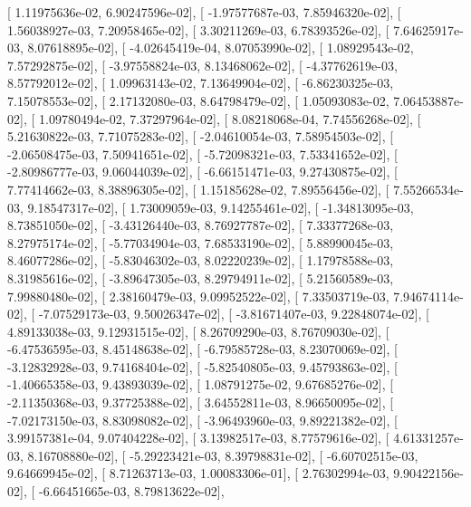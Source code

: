 \documentclass{article}
\begin{document}
       [  1.11975636e-02,   6.90247596e-02],
       [ -1.97577687e-03,   7.85946320e-02],
       [  1.56038927e-03,   7.20958465e-02],
       [  3.30211269e-03,   6.78393526e-02],
       [  7.64625917e-03,   8.07618895e-02],
       [ -4.02645419e-04,   8.07053990e-02],
       [  1.08929543e-02,   7.57292875e-02],
       [ -3.97558824e-03,   8.13468062e-02],
       [ -4.37762619e-03,   8.57792012e-02],
       [  1.09963143e-02,   7.13649904e-02],
       [ -6.86230325e-03,   7.15078553e-02],
       [  2.17132080e-03,   8.64798479e-02],
       [  1.05093083e-02,   7.06453887e-02],
       [  1.09780494e-02,   7.37297964e-02],
       [  8.08218068e-04,   7.74556268e-02],
       [  5.21630822e-03,   7.71075283e-02],
       [ -2.04610054e-03,   7.58954503e-02],
       [ -2.06508475e-03,   7.50941651e-02],
       [ -5.72098321e-03,   7.53341652e-02],
       [ -2.80986777e-03,   9.06044039e-02],
       [ -6.66151471e-03,   9.27430875e-02],
       [  7.77414662e-03,   8.38896305e-02],
       [  1.15185628e-02,   7.89556456e-02],
       [  7.55266534e-03,   9.18547317e-02],
       [  1.73009059e-03,   9.14255461e-02],
       [ -1.34813095e-03,   8.73851050e-02],
       [ -3.43126440e-03,   8.76927787e-02],
       [  7.33377268e-03,   8.27975174e-02],
       [ -5.77034904e-03,   7.68533190e-02],
       [  5.88990045e-03,   8.46077286e-02],
       [ -5.83046302e-03,   8.02220239e-02],
       [  1.17978588e-03,   8.31985616e-02],
       [ -3.89647305e-03,   8.29794911e-02],
       [  5.21560589e-03,   7.99880480e-02],
       [  2.38160479e-03,   9.09952522e-02],
       [  7.33503719e-03,   7.94674114e-02],
       [ -7.07529173e-03,   9.50026347e-02],
       [ -3.81671407e-03,   9.22848074e-02],
       [  4.89133038e-03,   9.12931515e-02],
       [  8.26709290e-03,   8.76709030e-02],
       [ -6.47536595e-03,   8.45148638e-02],
       [ -6.79585728e-03,   8.23070069e-02],
       [ -3.12832928e-03,   9.74168404e-02],
       [ -5.82540805e-03,   9.45793863e-02],
       [ -1.40665358e-03,   9.43893039e-02],
       [  1.08791275e-02,   9.67685276e-02],
       [ -2.11350368e-03,   9.37725388e-02],
       [  3.64552811e-03,   8.96650095e-02],
       [ -7.02173150e-03,   8.83098082e-02],
       [ -3.96493960e-03,   9.89221382e-02],
       [  3.99157381e-04,   9.07404228e-02],
       [  3.13982517e-03,   8.77579616e-02],
       [  4.61331257e-03,   8.16708880e-02],
       [ -5.29223421e-03,   8.39798831e-02],
       [ -6.60702515e-03,   9.64669945e-02],
       [  8.71263713e-03,   1.00083306e-01],
       [  2.76302994e-03,   9.90422156e-02],
       [ -6.66451665e-03,   8.79813622e-02],
\end{document}

